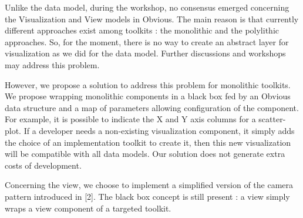 Unlike the data model, during the workshop, no consensus emerged concerning the Visualization and View models in Obvious. The main reason is that currently different approaches exist among toolkits : the monolithic and the polylithic approaches. So, for the moment, there is no way to create an abstract layer for visualization as we did for the data model. Further discussions and workshops may address this problem.

However, we propose a solution to address this problem for monolithic toolkits. We propose wrapping monolithic components in a black box fed by an Obvious data structure and a map of parameters allowing configuration of the component. For example, it is possible to indicate the X and Y axis columns for a scatter-plot. If a developer needs a non-existing visualization component, it simply adds the choice of an implementation toolkit to create it, then this new visualization will be compatible with all data models. Our solution does not generate extra costs of development.


Concerning the view, we choose to implement a simplified version of the camera pattern introduced in [2]. The black box concept is still present : a view simply wraps a view component of a targeted toolkit.

